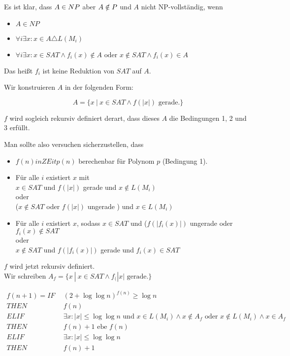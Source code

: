 Es ist klar, dass $A \in NP$ aber $A \notin P$ und $A$ nicht NP-vollständig, wenn
\begin{itemize}
    \item $A \in NP$
    \item $\forall i \exists x: x \in A \triangle L(M_i)$
    \item $\forall i \exists x: x \in SAT \land f_i(x) \notin A \text{ oder } x \notin SAT \land f_i(x) \in A$
\end{itemize}

Das heißt $f_i$ ist keine Reduktion von $SAT$ auf $A$.





Wir konstruieren $A$ in der folgenden Form:

$$ A = \{  x \ |\   x \in SAT  \land   f(|x|) \text{ gerade.}  \} $$

$f$ wird sogleich rekursiv definiert derart, dass dieses $A$ die Bedingungen 1, 2 und 3 erfüllt.

Man sollte also versuchen sicherzustellen, dass 

\begin{itemize}
    \item 
    $f(n) in ZEit p(n)$ berechenbar für Polynom $p$ (Bedingung 1).

    \item 
    Für alle $i$ existiert $x$ mit \\
    $x \in SAT$ und $f(|x|)$ gerade und $x \notin L(M_i)$\\
    oder\\
    ($ x \notin SAT$ oder $f(|x|)$ ungerade ) und $x \in L(M_i)$\\

    \item 
    Für alle $i$ existiert $x$, sodass
    $x \in SAT$ und ($f(|f_i(x)|)$ ungerade oder $f_i(x) \notin SAT$\\
    oder\\
    $x \notin SAT$ und $f(|f_i(x)|)$ gerade und $f_i(x) \in SAT$\\

\end{itemize}


$f$ wird jetzt rekursiv definiert.\\
Wir schreiben $A_f = \{ x \ |\   x \in SAT  \land  f_(|x| \text{ gerade.}  \}$

\begin{equation*}
\begin{split}
f(n+1) = 
    IF    &\ \ (2 + \log \log n)^{f(n)} \geq \log n \\
    THEN  &\ \ f(n) \\
    ELIF  &\ \ \exists x: |x| \leq \log \log n \text{ und } x \in L(M_i) \land x \notin A_f \text{ oder } x \notin L(M_i) \land x \in A_f \\
    THEN  &\ \ f(n) + 1 \text{ ebe } f(n) \\
    ELIF  &\ \ \exists x: |x| \leq \log \log n \\
    THEN  &\ \ f(n) + 1
\end{split}
\end{equation*}

